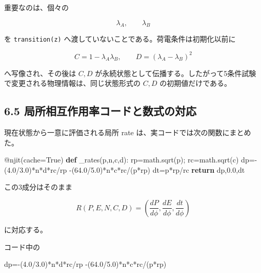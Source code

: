 \documentclass[
  a4paper,
]{ltjsarticle}
\newenvironment{Shaded}{}{}
\newcommand{\AttributeTok}[1]{\textcolor[rgb]{0.49,0.56,0.16}{#1}}
\newcommand{\ControlFlowTok}[1]{\textcolor[rgb]{0.00,0.44,0.13}{\textbf{#1}}}
\newcommand{\FloatTok}[1]{\textcolor[rgb]{0.25,0.63,0.44}{#1}}
\newcommand{\KeywordTok}[1]{\textcolor[rgb]{0.00,0.44,0.13}{\textbf{#1}}}
\newcommand{\NormalTok}[1]{#1}
\newcommand{\OperatorTok}[1]{\textcolor[rgb]{0.40,0.40,0.40}{#1}}
\newcommand{\VariableTok}[1]{\textcolor[rgb]{0.10,0.09,0.49}{#1}}
\begin{document}
重要なのは、個々の

\[
\lambda_A,
\qquad
\lambda_B
\]

を \texttt{transition(z)}
へ渡していないことである。荷電条件は初期化以前に

\[
C=1-\lambda_A\lambda_B,
\qquad
D=(\lambda_A-\lambda_B)^2
\]

へ写像され、その後は \(C,D\)
が永続状態として伝播する。したがって5条件試験で変更される物理情報は、同じ状態形式の
\(C,D\) の初期値だけである。

\subsection{6.5
局所相互作用率コードと数式の対応}\label{ux5c40ux6240ux76f8ux4e92ux4f5cux7528ux7387ux30b3ux30fcux30c9ux3068ux6570ux5f0fux306eux5bfeux5fdc}

現在状態から一意に評価される局所 rate
は、実コードでは次の関数にまとめた。

\begin{Shaded}
\begin{Highlighting}[]
\AttributeTok{@njit}\NormalTok{(cache}\OperatorTok{=}\VariableTok{True}\NormalTok{)}
\KeywordTok{def}\NormalTok{ \_rates(p,n,c,d):}
\NormalTok{    rp}\OperatorTok{=}\NormalTok{math.sqrt(p)}\OperatorTok{;}\NormalTok{ rc}\OperatorTok{=}\NormalTok{math.sqrt(c)}
\NormalTok{    dp}\OperatorTok{={-}}\NormalTok{(}\FloatTok{4.0}\OperatorTok{/}\FloatTok{3.0}\NormalTok{)}\OperatorTok{*}\NormalTok{n}\OperatorTok{*}\NormalTok{d}\OperatorTok{*}\NormalTok{rc}\OperatorTok{/}\NormalTok{rp }\OperatorTok{{-}}\NormalTok{(}\FloatTok{64.0}\OperatorTok{/}\FloatTok{5.0}\NormalTok{)}\OperatorTok{*}\NormalTok{n}\OperatorTok{*}\NormalTok{c}\OperatorTok{*}\NormalTok{rc}\OperatorTok{/}\NormalTok{(p}\OperatorTok{*}\NormalTok{rp)}
\NormalTok{    dt}\OperatorTok{=}\NormalTok{p}\OperatorTok{*}\NormalTok{rp}\OperatorTok{/}\NormalTok{rc}
    \ControlFlowTok{return}\NormalTok{ dp,}\FloatTok{0.0}\NormalTok{,dt}
\end{Highlighting}
\end{Shaded}

この3成分はそのまま

\[
R(P,E,N,C,D)
=
\left(
\frac{dP}{d\phi},
\frac{dE}{d\phi},
\frac{dt}{d\phi}
\right)
\]

に対応する。

コード中の

\begin{Shaded}
\begin{Highlighting}[]
\NormalTok{dp}\OperatorTok{={-}}\NormalTok{(}\FloatTok{4.0}\OperatorTok{/}\FloatTok{3.0}\NormalTok{)}\OperatorTok{*}\NormalTok{n}\OperatorTok{*}\NormalTok{d}\OperatorTok{*}\NormalTok{rc}\OperatorTok{/}\NormalTok{rp }\OperatorTok{{-}}\NormalTok{(}\FloatTok{64.0}\OperatorTok{/}\FloatTok{5.0}\NormalTok{)}\OperatorTok{*}\NormalTok{n}\OperatorTok{*}\NormalTok{c}\OperatorTok{*}\NormalTok{rc}\OperatorTok{/}\NormalTok{(p}\OperatorTok{*}\NormalTok{rp)}
\end{Highlighting}
\end{Shaded}
\end{document}
